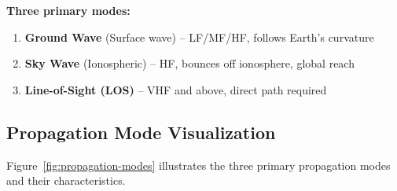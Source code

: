 \textbf{Three primary modes:}
\begin{enumerate}
\item \textbf{Ground Wave} (Surface wave) -- LF/MF/HF, follows Earth's curvature
\item \textbf{Sky Wave} (Ionospheric) -- HF, bounces off ionosphere, global reach
\item \textbf{Line-of-Sight (LOS)} -- VHF and above, direct path required
\end{enumerate}

\subsection{Propagation Mode Visualization}

Figure~\ref{fig:propagation-modes} illustrates the three primary propagation modes and their characteristics.


